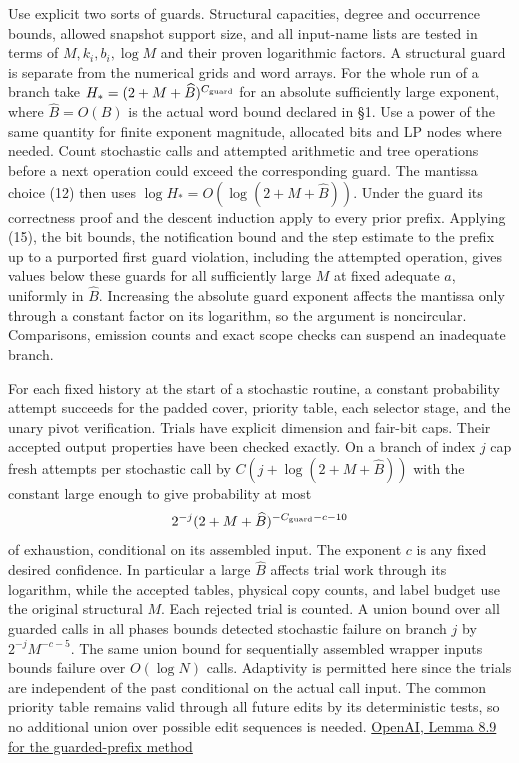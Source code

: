 \documentclass[11pt]{article}
\begin{document}
Use explicit two sorts of guards. Structural capacities, degree and occurrence bounds, allowed snapshot support size, and all input-name lists are tested in terms of \(M,k_i,b_i,\log M\) and their proven logarithmic factors. A structural guard is separate from the numerical grids and word arrays. For the whole run of a branch take \(H_\ast=(2+M+\widehat B)^{C_{\rm guard}}\) for an absolute sufficiently large exponent, where \(\widehat B=O(B)\) is the actual word bound declared in §1. Use a power of the same quantity for finite exponent magnitude, allocated bits and LP nodes where needed. Count stochastic calls and attempted arithmetic and tree operations before a next operation could exceed the corresponding guard. The mantissa choice (12) then uses \(\log H_\ast=O(\log(2+M+\widehat B))\). Under the guard its correctness proof and the descent induction apply to every prior prefix. Applying (15), the bit bounds, the notification bound and the step estimate to the prefix up to a purported first guard violation, including the attempted operation, gives values below these guards for all sufficiently large \(M\) at fixed adequate \(a\), uniformly in \(\widehat B\). Increasing the absolute guard exponent affects the mantissa only through a constant factor on its logarithm, so the argument is noncircular. Comparisons, emission counts and exact scope checks can suspend an inadequate branch.

For each fixed history at the start of a stochastic routine, a constant probability attempt succeeds for the padded cover, priority table, each selector stage, and the unary pivot verification. Trials have explicit dimension and fair-bit caps. Their accepted output properties have been checked exactly. On a branch of index \(j\) cap fresh attempts per stochastic call by \(C(j+\log(2+M+\widehat B))\) with the constant large enough to give probability at most
\[
     2^{-j}(2+M+\widehat B)^{-C_{\rm guard}-c-10}
\]
of exhaustion, conditional on its assembled input. The exponent \(c\) is any fixed desired confidence. In particular a large \(\widehat B\) affects trial work through its logarithm, while the accepted tables, physical copy counts, and label budget use the original structural \(M\). Each rejected trial is counted. A union bound over all guarded calls in all phases bounds detected stochastic failure on branch \(j\) by \(2^{-j}M^{-c-5}\). The same union bound for sequentially assembled wrapper inputs bounds failure over \(O(\log N)\) calls. Adaptivity is permitted here since the trials are independent of the past conditional on the actual call input. The common priority table remains valid through all future edits by its deterministic tests, so no additional union over possible edit sequences is needed. \href{https://raw.githubusercontent.com/openai/math/adc7f1241b42e322a6451854ab7e4b4c146bf78a/preprints/Almost-Linear-Time-Maximum-Cardinality-Matching-in-Sparse-General-Graphs-September-24-2026/main.pdf\#page=74}{OpenAI, Lemma 8.9 for the guarded-prefix method}
\end{document}
